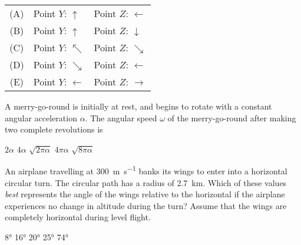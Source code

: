 \documentclass{../../oss-classkick-exam}
\begin{document}
\begin{multicols*}{2}
\begin{questions}
    \begin{tabular}{cll}
      (A) & Point $Y$: {\LARGE $\uparrow$} & Point $Z$: {\LARGE $\leftarrow$}\\
      (B) & Point $Y$: {\LARGE $\uparrow$} & Point $Z$: {\LARGE $\downarrow$}\\
      (C) & Point $Y$: {\LARGE $\nwarrow$} & Point $Z$: {\LARGE $\searrow$}\\
      (D) & Point $Y$: {\LARGE $\searrow$} & Point $Z$: {\LARGE $\leftarrow$}\\
      (E) & Point $Y$: {\LARGE $\leftarrow$}&Point $Z$: {\LARGE $\rightarrow$}\\
    \end{tabular}
    \columnbreak

    \question A merry-go-round is initially at rest, and begins to rotate with a
    constant angular acceleration $\alpha$. The angular speed $\omega$ of the
    merry-go-round after making two complete revolutions is
    \begin{choices}
      \choice $2\alpha$
      \choice $4\alpha$
      \choice $\sqrt{2\pi\alpha}$
      \choice $4\pi\alpha$
      \choice $\sqrt{8\pi\alpha}$
    \end{choices}

    \question An airplane travelling at \SI{300}{\metre\per\second} banks its
    wings to enter into a horizontal circular turn. The circular path has a
    radius of \SI{2.7}{\kilo\metre}. Which of these values \emph{best}
    represents the angle of the wings relative to the horizontal if the airplane
    experiences no change in altitude during the turn? Assume that the wings
    are completely horizontal during level flight.
    \begin{choices}
      \choice\ang{8}
      \choice\ang{16}
      \choice\ang{20}
      \choice\ang{25}
      \correctchoice\ang{74}
    \end{choices}
    
    

\end{questions}
\end{multicols*}
\end{document}
